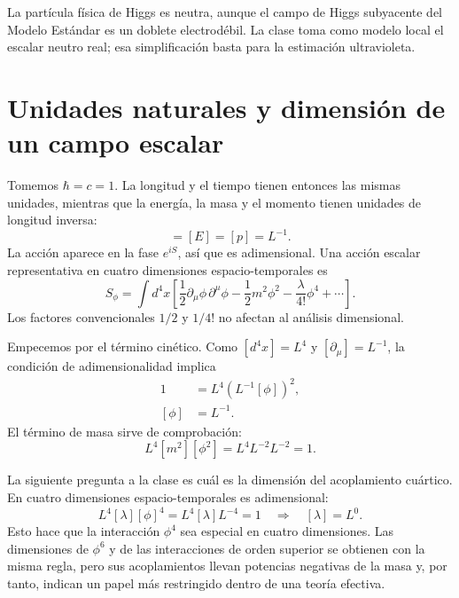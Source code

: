 La partícula física de Higgs es neutra, aunque el campo de Higgs subyacente del Modelo Estándar es un doblete electrodébil. La clase toma como modelo local el escalar neutro real; esa simplificación basta para la estimación ultravioleta.

\section{Unidades naturales y dimensión de un campo escalar}

Tomemos \(\hbar=c=1\). La longitud y el tiempo tienen entonces las mismas unidades, mientras que la energía, la masa y el momento tienen unidades de longitud inversa:
\begin{equation}
[m]=[E]=[p]=L^{-1}.
\end{equation}
La acción aparece en la fase \(e^{iS}\), así que es adimensional. Una acción escalar representativa en cuatro dimensiones espacio-temporales es
\begin{equation}
S_\phi=\int d^4x\left[
\frac12\partial_\mu\phi\,\partial^\mu\phi
-\frac12m^2\phi^2
-\frac{\lambda}{4!}\phi^4
+\cdots\right].
\end{equation}
Los factores convencionales \(1/2\) y \(1/4!\) no afectan al análisis dimensional.

Empecemos por el término cinético. Como \([d^4x]=L^4\) y \([\partial_\mu]=L^{-1}\), la condición de adimensionalidad implica
\begin{align}
1
&=L^4\left(L^{-1}[\phi]\right)^2,\\
[\phi]&=L^{-1}.
\end{align}
El término de masa sirve de comprobación:
\begin{equation}
L^4[m^2][\phi^2]
=L^4L^{-2}L^{-2}=1.
\end{equation}

La siguiente pregunta a la clase es cuál es la dimensión del acoplamiento cuártico. En cuatro dimensiones espacio-temporales es adimensional:
\begin{equation}
L^4[\lambda][\phi]^4=L^4[\lambda]L^{-4}=1
\quad\Longrightarrow\quad [\lambda]=L^0.
\end{equation}
Esto hace que la interacción \(\phi^4\) sea especial en cuatro dimensiones. Las dimensiones de \(\phi^6\) y de las interacciones de orden superior se obtienen con la misma regla, pero sus acoplamientos llevan potencias negativas de la masa y, por tanto, indican un papel más restringido dentro de una teoría efectiva.


